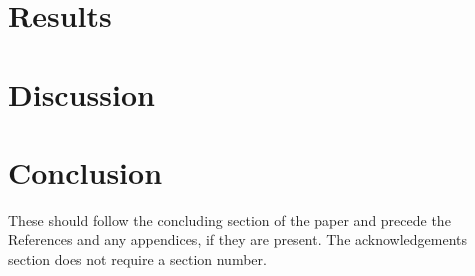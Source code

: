 \documentclass[smallextended]{svjour3}
\begin{document}
\section{Results}
\label{sec:results}


\section{Discussion}
\label{sec:discussion}



\section{Conclusion}
\label{sec:conclusion}



\begin{acknowledgements}
These should follow the concluding section of the paper and precede the References and any appendices, if they are present. The acknowledgements section does not require a section number. 
\end{acknowledgements} 





\end{document}
